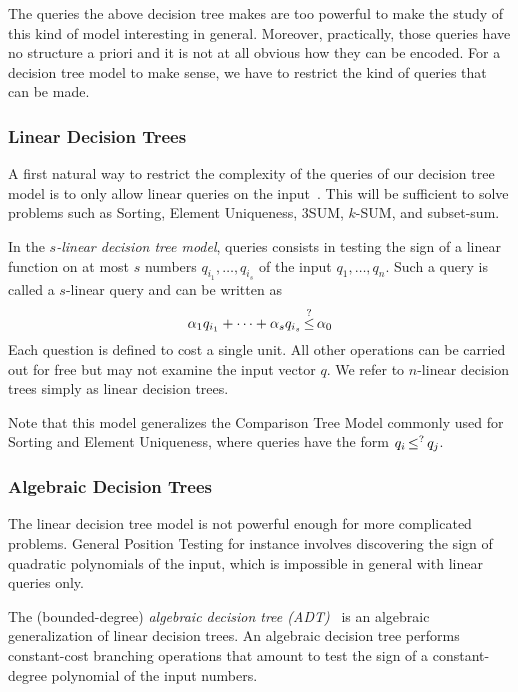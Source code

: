 The queries the above decision tree makes are too powerful to make the study of
this kind of model interesting in general.
%
Moreover, practically, those queries have no structure a priori and it is not at
all obvious how they can be encoded.
%
For a decision tree model to make sense, we have to restrict the kind of
queries that can be made.

\subsubsection{Linear Decision Trees}

A first natural way to restrict the complexity of the queries of our decision
tree model is to only allow linear queries on the input~\cite[Section~2]{DL78}.
This will be sufficient to solve problems such as Sorting, Element Uniqueness,
3SUM, \(k\)-SUM, and subset-sum.

In the \emph{\(s\)-linear decision tree model}, queries consists
in testing the sign of a linear function on at most \(s\) numbers \(q_{i_1},\ldots,q_{i_s}\) of the
input \(q_1,\ldots,q_n\). Such a query is called a \(s\)-linear query and
can be written as
%
\begin{displaymath}
	\alpha_1 q_{i_1} + \cdots + \alpha_s q_{i_s} \mathop{\leq}^{?} \alpha_0
\end{displaymath}
%
Each question is defined to cost a single unit. All other operations can be
carried out for free but may not examine the input vector $q$. We refer to
$n$-linear decision trees simply as linear decision trees.

Note that this model generalizes the Comparison Tree Model commonly used for
Sorting and Element Uniqueness, where queries have the form \(q_i \mathop{\leq}^{?}
q_j\).

\subsubsection{Algebraic Decision Trees}
The linear decision tree model is not powerful enough for more complicated
problems. General Position Testing for instance involves discovering the sign
of quadratic polynomials of the input, which is impossible in general with
linear queries only.

The (bounded-degree) \emph{algebraic decision tree (ADT)}~\cite{R72,Y81,SY82}
is an algebraic generalization of linear decision trees.
An algebraic decision tree performs constant-cost branching operations that
amount to test the sign of
a constant-degree polynomial of the input numbers.

